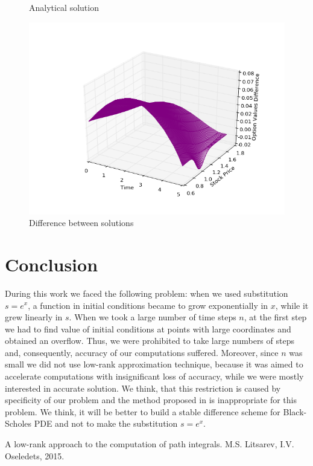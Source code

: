 \documentclass[11pt,a4paper]{extarticle}
\begin{document}
\begin{minipage}{\linewidth}
\begin{minipage}{0.29\linewidth}
\begin{figure}[H]
              \caption{Analytical solution}
          \end{figure}
      \end{minipage}
      \hspace{0.04\linewidth}
      \begin{minipage}{0.29\linewidth}
          \begin{figure}[H]
              \includegraphics[width=\linewidth]{Figures/a-o-n-put-dif}
              \caption{Difference between solutions}
          \end{figure}
      \end{minipage}
\end{minipage}

\section{Conclusion}

During this work we faced the following problem: when we used substitution $s = e^x$, a function in initial conditions became to grow exponentially in $x$, while it grew linearly in $s$.
When we took a large number of time steps $n$, at the first step we had to find value of initial conditions at points with large coordinates and obtained an overflow.
Thus, we were prohibited to take large numbers of steps and, consequently, accuracy of our computations suffered.
Moreover, since $n$ was small we did not use low-rank approximation technique, because it was aimed to accelerate computations with insignificant loss of accuracy, while we were mostly interested in accurate solution.
We think, that this restriction is caused by specificity of our problem and the method proposed in \cite{oseledets} is inappropriate for this problem.
We think, it will be better to build a stable difference scheme for Black-Scholes PDE and not to make the substitution $s = e^x$.

\renewcommand{\refname}{References}
\begin{thebibliography}{9}
     A low-rank approach to the computation of path integrals. M.S. Litsarev, I.V. Oseledets, 2015.
\end{thebibliography}
\end{document}

